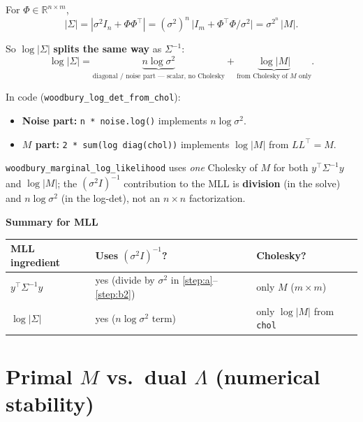 \documentclass[11pt]{article}
\newcommand{\noise}{\sigma^2}
\newcommand{\Sig}{\Sigma}
\newcommand{\Ph}{\Phi}
\begin{document}
\begin{lemma}
For $\Ph\in\mathbb{R}^{n\times m}$,
\[
  |\Sig|
  = |\noise I_n + \Ph\Ph^{\top}|
  = (\noise)^n \,\bigl|I_m + \Ph^{\top}\Ph/\noise\bigr|
  = \noise^n\,|M|.
\]
\end{lemma}

So $\log|\Sig|$ \textbf{splits the same way} as $\Sig^{-1}$:
\begin{equation}
  \label{eq:logdet-split}
  \boxed{
  \log|\Sig|
  = \underbrace{n\log\noise}_{\text{diagonal / noise part --- scalar, no Cholesky}}
  + \underbrace{\log|M|}_{\text{from Cholesky of $M$ only}}.
  }
\end{equation}

In code (\texttt{woodbury\_log\_det\_from\_chol}):
\begin{itemize}
  \item \textbf{Noise part:} \texttt{n * noise.log()} implements $n\log\noise$.
  \item \textbf{$M$ part:} \texttt{2 * sum(log diag(chol))} implements $\log|M|$ from $LL^{\top}=M$.
\end{itemize}

\texttt{woodbury\_marginal\_log\_likelihood} uses \emph{one} Cholesky of $M$ for both
$y^{\top}\Sig^{-1}y$ and $\log|M|$; the $(\noise I)^{-1}$ contribution to the MLL is
\textbf{division} (in the solve) and \textbf{$n\log\noise$} (in the log-det), not an $n\times n$ factorization.

\begin{samebox}
\textbf{Summary for MLL}
\begin{center}
\renewcommand{\arraystretch}{1.25}
\begin{tabular}{@{}lll@{}}
\toprule
\textbf{MLL ingredient} & \textbf{Uses $(\noise I)^{-1}$?} & \textbf{Cholesky?} \\
\midrule
$y^{\top}\Sig^{-1}y$ & yes (divide by $\noise$ in \eqref{step:a}--\eqref{step:b2}) & only $M$ ($m\times m$) \\
$\log|\Sig|$ & yes ($n\log\noise$ term) & only $\log|M|$ from \texttt{chol} \\
\bottomrule
\end{tabular}
\end{center}
\end{samebox}

\section{Primal $M$ vs.\ dual $\Lambda$ (numerical stability)}
\label{sec:primal-dual}
\end{document}
